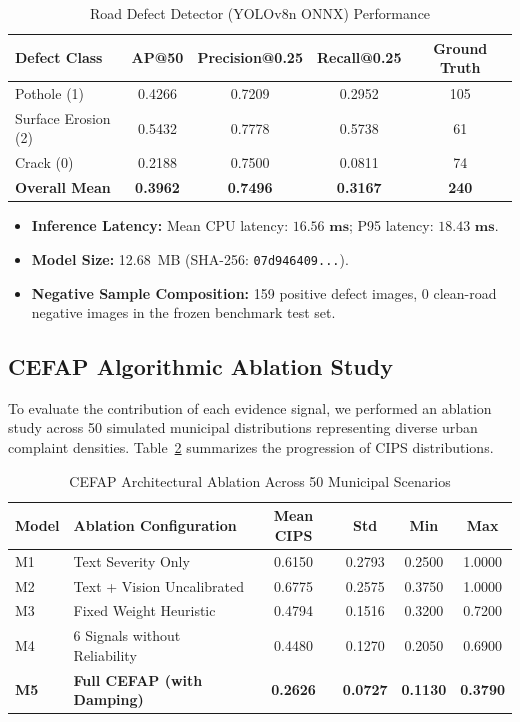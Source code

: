 \documentclass[conference]{IEEEtran}
\begin{document}
\begin{table}[htbp]
\caption{Road Defect Detector (YOLOv8n ONNX) Performance}
\label{tab:detector}
\centering
\begin{tabular}{lcccc}
\toprule
\textbf{Defect Class} & \textbf{AP@50} & \textbf{Precision@0.25} & \textbf{Recall@0.25} & \textbf{Ground Truth} \\
\midrule
Pothole (1)          & 0.4266 & 0.7209 & 0.2952 & 105 \\
Surface Erosion (2)  & 0.5432 & 0.7778 & 0.5738 & 61 \\
Crack (0)            & 0.2188 & 0.7500 & 0.0811 & 74 \\
\midrule
\textbf{Overall Mean} & \textbf{0.3962} & \textbf{0.7496} & \textbf{0.3167} & \textbf{240} \\
\bottomrule
\end{tabular}
\end{table}

\begin{itemize}
    \item \textbf{Inference Latency:} Mean CPU latency: $\mathbf{16.56\text{ ms}}$; P95 latency: $\mathbf{18.43\text{ ms}}$.
    \item \textbf{Model Size:} 12.68~MB (SHA-256: \texttt{07d946409...}).
    \item \textbf{Negative Sample Composition:} 159 positive defect images, 0 clean-road negative images in the frozen benchmark test set.
\end{itemize}

\subsection{CEFAP Algorithmic Ablation Study}
To evaluate the contribution of each evidence signal, we performed an ablation study across 50 simulated municipal distributions representing diverse urban complaint densities. Table~\ref{tab:ablation} summarizes the progression of CIPS distributions.

\begin{table}[htbp]
\caption{CEFAP Architectural Ablation Across 50 Municipal Scenarios}
\label{tab:ablation}
\centering
\begin{tabular}{llcccc}
\toprule
\textbf{Model} & \textbf{Ablation Configuration} & \textbf{Mean CIPS} & \textbf{Std} & \textbf{Min} & \textbf{Max} \\
\midrule
M1 & Text Severity Only             & 0.6150 & 0.2793 & 0.2500 & 1.0000 \\
M2 & Text + Vision Uncalibrated     & 0.6775 & 0.2575 & 0.3750 & 1.0000 \\
M3 & Fixed Weight Heuristic         & 0.4794 & 0.1516 & 0.3200 & 0.7200 \\
M4 & 6 Signals without Reliability  & 0.4480 & 0.1270 & 0.2050 & 0.6900 \\
\textbf{M5} & \textbf{Full CEFAP (with Damping)} & \textbf{0.2626} & \textbf{0.0727} & \textbf{0.1130} & \textbf{0.3790} \\
\bottomrule
\end{tabular}
\end{table}
\end{document}
